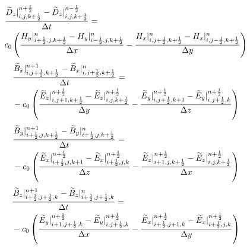 \begin{equation}
  \begin{split}
    \displaystyle & \frac{\widetilde{D}_z|_{i,j,k+\frac{1}{2}}^{n+\frac{1}{2}} - \widetilde{D}_z|_{i,j,k+\frac{1}{2}}^{n-\frac{1}{2}}}{\Delta t} = \\
    \displaystyle & c_0\left(\frac{H_y|_{i+\frac{1}{2},j,k+\frac{1}{2}}^{n} - H_y|_{i-\frac{1}{2},j,k+\frac{1}{2}}^{n}}{\Delta x} - \frac{H_x|_{i,j+\frac{1}{2},k+\frac{1}{2}}^{n} - H_x|_{i,j-\frac{1}{2},k+\frac{1}{2}}^{n}}{\Delta y}\right)\\
  \end{split}
\end{equation}
\begin{equation}
  \begin{split}
    \displaystyle & \frac{\widetilde{B}_x|_{i,j+\frac{1}{2},k+\frac{1}{2}}^{n+1} - \widetilde{B}_x|_{i,j+\frac{1}{2},k+\frac{1}{2}}^{n}}{\Delta t} = \\
    \displaystyle & - c_0\left(\frac{\widetilde{E}_z|_{i,j+1,k+\frac{1}{2}}^{n+\frac{1}{2}} - \widetilde{E}_z|_{i,j,k+\frac{1}{2}}^{n+\frac{1}{2}}}{\Delta y} - \frac{\widetilde{E}_y|_{i,j+\frac{1}{2},k+1}^{n+\frac{1}{2}} - \widetilde{E}_y|_{i,j+\frac{1}{2},k}^{n+\frac{1}{2}}}{\Delta z}\right)\\
  \end{split}
\end{equation}
\begin{equation}
  \begin{split}
    \displaystyle & \frac{\widetilde{B}_y|_{i+\frac{1}{2},j,k+\frac{1}{2}}^{n+1} - \widetilde{B}_y|_{i+\frac{1}{2},j,k+\frac{1}{2}}^{n}}{\Delta t} = \\
    \displaystyle & - c_0\left(\frac{\widetilde{E}_x|_{i+\frac{1}{2},j,k+1}^{n+\frac{1}{2}} - \widetilde{E}_x|_{i+\frac{1}{2},j,k}^{n+\frac{1}{2}}}{\Delta z} - \frac{\widetilde{E}_z|_{i+1,j,k+\frac{1}{2}}^{n+\frac{1}{2}} - \widetilde{E}_z|_{i,j,k+\frac{1}{2}}^{n+\frac{1}{2}}}{\Delta x}\right)\\
  \end{split}
\end{equation}
\begin{equation}
  \begin{split}
    \displaystyle & \frac{\widetilde{B}_z|_{i+\frac{1}{2},j+\frac{1}{2},k}^{n+1} - \widetilde{B}_z|_{i+\frac{1}{2},j+\frac{1}{2},k}^{n}}{\Delta t} = \\
    \displaystyle & - c_0\left(\frac{\widetilde{E}_y|_{i+1,j+\frac{1}{2},k}^{n+\frac{1}{2}} - \widetilde{E}_y|_{i,j+\frac{1}{2},k}^{n+\frac{1}{2}}}{\Delta x} - \frac{\widetilde{E}_x|_{i+\frac{1}{2},j+1,k}^{n+\frac{1}{2}} - \widetilde{E}_x|_{i+\frac{1}{2},j,k}^{n+\frac{1}{2}}}{\Delta y}\right)
  \end{split}
\end{equation}
